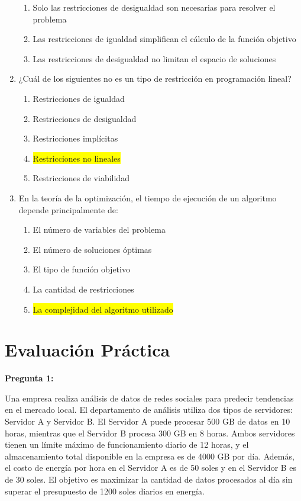 \documentclass{article}
\begin{document}
\begin{enumerate}
\begin{enumerate}
\item Solo las restricciones de desigualdad son necesarias para resolver el problema
\item Las restricciones de igualdad simplifican el cálculo de la función objetivo
\item Las restricciones de desigualdad no limitan el espacio de soluciones
\end{enumerate}

\item ¿Cuál de los siguientes no es un tipo de restricción en programación lineal?
\begin{enumerate}
\item Restricciones de igualdad
\item Restricciones de desigualdad
\item Restricciones implícitas
\item \colorbox{yellow}{Restricciones no lineales}
\item Restricciones de viabilidad
\end{enumerate}

\item En la teoría de la optimización, el tiempo de ejecución de un algoritmo depende principalmente de:
\begin{enumerate}
\item El número de variables del problema
\item El número de soluciones óptimas
\item El tipo de función objetivo
\item La cantidad de restricciones
\item \colorbox{yellow}{La complejidad del algoritmo utilizado}
\end{enumerate}
\end{enumerate}

\section{Evaluación Práctica}

\textbf{Pregunta 1:}

Una empresa realiza análisis de datos de redes sociales para predecir tendencias en el mercado local. El departamento de análisis utiliza dos tipos de servidores: Servidor A y Servidor B. El Servidor A puede procesar 500 GB de datos en 10 horas, mientras que el Servidor B procesa 300 GB en 8 horas. Ambos servidores tienen un límite máximo de funcionamiento diario de 12 horas, y el almacenamiento total disponible en la empresa es de 4000 GB por día. Además, el costo de energía por hora en el Servidor A es de 50 soles y en el Servidor B es de 30 soles. El objetivo es maximizar la cantidad de datos procesados al día sin superar el presupuesto de 1200 soles diarios en energía.
\end{document}
